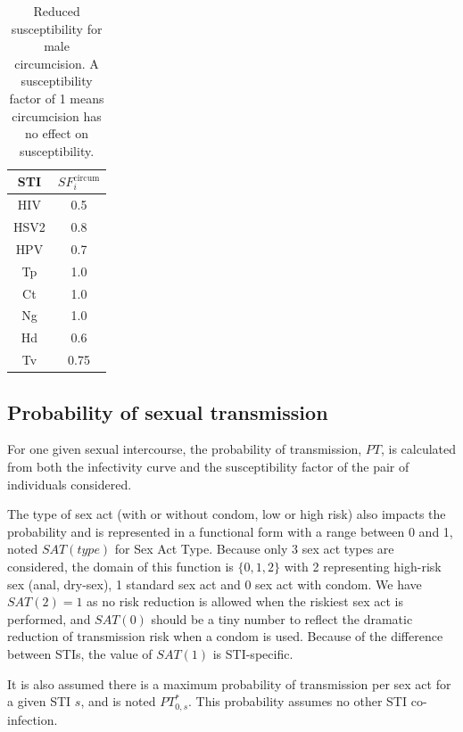 \documentclass[11pt, onecolumn]{article}
\begin{document}
\begin{table}[htdp]
\begin{center}
\begin{tabular}{|cc|}
\hline
STI & $SF_i^{\mathrm{circum}}$\\
\hline
HIV		& 0.5 \\
HSV2	& 0.8 \\
HPV		& 0.7 \\
Tp		& 1.0 \\
Ct		& 1.0 \\
Ng		& 1.0 \\
Hd		& 0.6 \\
Tv		& 0.75 \\

\hline
\end{tabular}
\end{center}
\caption{Reduced susceptibility for male circumcision. A susceptibility factor of 1 means circumcision has no effect on susceptibility.}
\label{tab:circum}
\end{table}



\subsection{Probability of sexual transmission}

For one given sexual intercourse, the probability of transmission, $PT$, is calculated from both the infectivity curve and the susceptibility factor of the pair of individuals considered. 

The type of sex act (with or without condom, low or high risk) also impacts the probability and is represented in a functional form with a range between 0 and 1, noted $SAT(type)$ for Sex Act Type. Because only 3 sex act types are considered, the domain of this function is $\{0,1,2\}$ with 2 representing high-risk sex (anal, dry-sex), 1 standard sex act and 0 sex act with condom. We have $SAT(2)=1$ as no risk reduction is allowed when the riskiest sex act is performed, and $SAT(0)$ should be a tiny number to reflect the dramatic reduction of transmission risk when a condom is used. Because of the difference between STIs, the value of $SAT(1)$ is STI-specific.

It is also assumed there is a maximum probability of transmission per sex act for a given STI $s$, and is noted $PT_{0,s}^*$. This probability assumes no other STI co-infection. 
\end{document}
